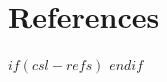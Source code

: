 
\hypertarget{references}{%
	\chapter{References}\label{references}}

\begingroup
\fontsize{10}{6}\selectfont

$if(csl-refs)$
\newlength{\cslhangindent}
\setlength{\cslhangindent}{1.5em}
\newenvironment{cslreferences}%
{$if(csl-hanging-indent)$\setlength{\parindent}{0pt}%
	\everypar{\setlength{\hangindent}{\cslhangindent}}\ignorespaces$endif$}%
{\par}
$endif$

